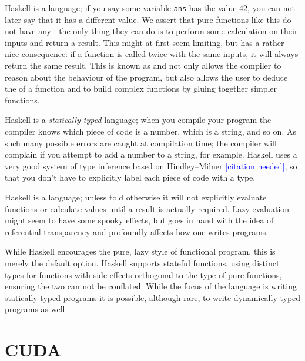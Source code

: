 Haskell is a  language; if you say some variable \texttt{ans} has
the value $42$, you can not later say that it has a different value. We assert
that pure functions like this do not have any : the only
thing they can do is to perform some calculation on their inputs and return a
result. This might at first seem limiting, but has a rather nice consequence: if
a function is called twice with the same inputs, it will always return the same
result. This is known as  and not only allows
the compiler to reason about the behaviour of the program, but also allows the
user to deduce the  of a function and to build complex
functions by gluing together simpler functions.

Haskell is a \emph{statically typed} language; when you
compile your program the compiler knows which piece of code is a number, which
is a string, and so on. As such many possible errors are caught at compilation
time; the compiler will complain if you attempt to add a number to a string, for
example. Haskell uses a very good system of type inference based on
Hindley--Milner \textcolor{blue}{[citation needed]}, so that you don't have to
explicitly label each piece of code with a type.

Haskell is a  language; unless told otherwise it will not
explicitly evaluate functions or calculate values until a result is actually
required. Lazy evaluation might seem to have some spooky effects, but goes in
hand with the idea of referential transparency and profoundly affects how one
writes programs.

While Haskell encourages the pure, lazy style of functional program, this is
merely the default option. Haskell supports stateful functions, using distinct
types for functions with side effects orthogonal to the type of pure functions,
ensuring the two can not be conflated. While the focus of the language is
writing statically typed programs it is possible, although rare, to write
dynamically typed programs as well.





\section{CUDA}

